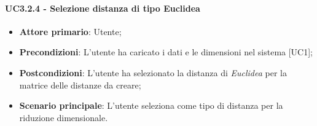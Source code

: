 \paragraph{UC3.2.4 - Selezione distanza di tipo Euclidea}
\begin{itemize}
	\item \textbf{Attore primario}: Utente;
	\item \textbf{Precondizioni}: L'utente ha caricato i dati e le dimensioni nel sistema [UC1];
	\item \textbf{Postcondizioni}: L'utente ha selezionato la distanza di \textit{Euclidea} per la matrice delle distanze da creare;
	\item \textbf{Scenario principale}: L'utente seleziona  come tipo di distanza per la riduzione dimensionale.
\end{itemize}